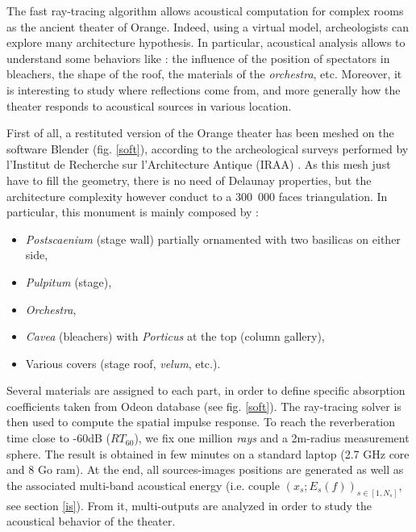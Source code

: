 \documentclass[AMA,STIX1COL]{WileyNJD-v2}
\begin{document}
The fast ray-tracing algorithm allows acoustical computation for complex rooms as the ancient theater of Orange. Indeed, using a virtual model, archeologists can explore many architecture hypothesis. In particular, acoustical analysis allows to understand some behaviors like : the influence of the position of spectators in bleachers, the shape of the roof, the materials of the \textit{orchestra}, etc. Moreover, it is interesting to study where reflections come from, and more generally how the theater responds to acoustical sources in various location.     

First of all, a restituted version of the Orange theater has been meshed on the software Blender (fig. \ref{soft}), according to the archeological surveys performed by l'Institut de Recherche sur l'Architecture Antique (IRAA) \cite{orangeTxt}. As this mesh just have to fill the geometry, there is no need of Delaunay properties, but the architecture complexity however conduct to a 300~000 faces triangulation. In particular, this monument is mainly composed by :
\begin{itemize}
 \item \textit{Postscaenium} (stage wall) partially ornamented with two basilicas on either side,
 \item \textit{Pulpitum} (stage),
 \item \textit{Orchestra},
 \item \textit{Cavea} (bleachers) with \textit{Porticus} at the top (column gallery),
  \item Various covers (stage roof, \textit{velum}, etc.).
\end{itemize}
Several materials are assigned to each part, in order to define specific absorption coefficients taken from Odeon database \cite{odeon} (see fig. \ref{soft}). The ray-tracing solver is then used to compute the spatial impulse response. To reach the reverberation time close to -60dB ($RT_{60}$), we fix one million \textit{rays} and a 2m-radius measurement sphere. The result is obtained in few minutes on a standard laptop (2.7 GHz core and 8 Go ram). At the end, all sources-images positions are generated as well as the associated multi-band acoustical energy (i.e. couple $(x_s;E_s(f))_{s \in [1, N_s]}$, see section \ref{is}). From it, multi-outputs are analyzed in order to study the acoustical behavior of the theater.
\end{document}
